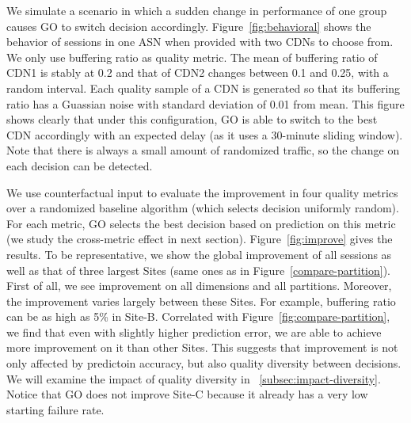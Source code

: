  We simulate a scenario in which a sudden change in performance of one group causes GO to switch decision accordingly. Figure~\ref{fig:behavioral} shows the behavior of sessions in one ASN when provided with two CDNs to choose from. We only use buffering ratio as quality metric. The mean of buffering ratio of CDN1 is stably at 0.2 and that of CDN2 changes between 0.1 and 0.25, with a random interval. Each quality sample of a CDN is generated so that its buffering ratio has a Guassian noise with standard deviation of 0.01 from mean. This figure shows clearly that under this configuration, GO is able to switch to the best CDN accordingly with an expected delay (as it uses a 30-minute sliding window). Note that there is always a small amount of randomized traffic, so the change on each decision can be detected. %




\label{subsec:go-improve}
We use counterfactual input to evaluate the improvement in four quality metrics over a randomized baseline algorithm (which selects decision uniformly random). For each metric, GO selects the best decision based on prediction on this metric (we study the cross-metric effect in next section). Figure~\ref{fig:improve} gives the results. To be representative, we show the global improvement of all sessions as well as that of three largest Sites (same ones as in Figure~\ref{compare-partition}). First of all, we see improvement on all dimensions and all partitions. Moreover, the improvement varies largely between these Sites. For example, buffering ratio can be as high as 5\% in Site-B. Correlated with Figure~\ref{fig:compare-partition}, we find that even with slightly higher prediction error, we are able to achieve more improvement on it than other Sites. This suggests that improvement is not only affected by predictoin accuracy, but also quality diversity between decisions. We will examine the impact of quality diversity in \Section~\ref{subsec:impact-diversity}.
Notice that GO does not improve Site-C because it already has a very low starting failure rate.



